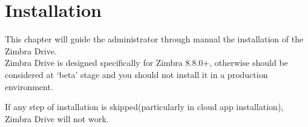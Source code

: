 \chapter{Installation}

This chapter will guide the administrator through manual the installation of the Zimbra Drive.\\
Zimbra Drive is designed specifically for Zimbra 8.8.0+, otherwise should be considered at `beta'
stage and you should not install it in a production environment.\\
\begin{warning}
If any step of installation is skipped(particularly in cloud app installation), Zimbra Drive will not work.
\end{warning}



